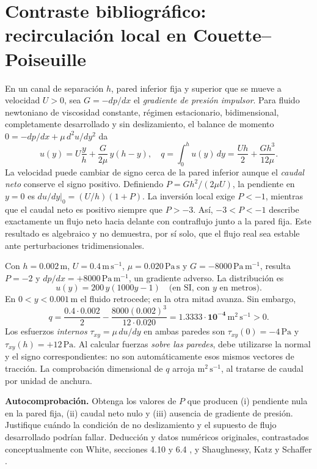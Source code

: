 
\section{Contraste bibliográfico: recirculación local en Couette--Poiseuille}
\label{sec:ref26-couette}

En un canal de separación \(h\), pared inferior fija y superior que se mueve a velocidad \(U>0\), sea \(G=-dp/dx\) el \emph{gradiente de presión impulsor}. Para fluido newtoniano de viscosidad constante, régimen estacionario, bidimensional, completamente desarrollado y sin deslizamiento, el balance de momento \(0=-dp/dx+\mu\,d^2u/dy^2\) da
\begin{equation}
u(y)=U\frac yh+\frac{G}{2\mu}\,y(h-y),\quad
q=\int_0^h u(y)\,dy=\frac{Uh}{2}+\frac{Gh^3}{12\mu}.
\label{eq:ref26-couette-q}
\end{equation}
La velocidad puede cambiar de signo cerca de la pared inferior aunque el \emph{caudal neto} conserve el signo positivo. Definiendo \(P=Gh^2/(2\mu U)\), la pendiente en \(y=0\) es \(du/dy|_0=(U/h)(1+P)\). La inversión local exige \(P<-1\), mientras que el caudal neto es positivo siempre que \(P>-3\). Así, \(-3<P<-1\) describe exactamente un flujo neto hacia delante con contraflujo junto a la pared fija. Este resultado es algebraico y no demuestra, por sí solo, que el flujo real sea estable ante perturbaciones tridimensionales.

\begin{tcolorbox}[title={Ejemplo guiado original: caudal y esfuerzos}, studiumdef, breakable]
Con \(h=0.002\,\mathrm{m}\), \(U=0.4\,\mathrm{m\,s^{-1}}\), \(\mu=0.020\,\mathrm{Pa\,s}\) y \(G=-8000\,\mathrm{Pa\,m^{-1}}\), resulta \(P=-2\) y \(dp/dx=+8000\,\mathrm{Pa\,m^{-1}}\), un gradiente adverso. La distribución es
\[
 u(y)=200\,y(1000y-1)\quad\text{(en SI, con \(y\) en metros)}.
\]
En \(0<y<0.001\,\mathrm{m}\) el fluido retrocede; en la otra mitad avanza. Sin embargo,
\[
 q=\frac{0.4\cdot0.002}{2}
    -\frac{8000(0.002)^3}{12\cdot0.020}
   =\mathbf{1.3333\cdot10^{-4}\,\mathrm{m^2\,s^{-1}}}>0.
\]
Los esfuerzos \emph{internos} \(\tau_{xy}=\mu\,du/dy\) en ambas paredes son \(\tau_{xy}(0)=-4\,\mathrm{Pa}\) y \(\tau_{xy}(h)=+12\,\mathrm{Pa}\). Al calcular fuerzas \emph{sobre las paredes}, debe utilizarse la normal y el signo correspondientes: no son automáticamente esos mismos vectores de tracción. La comprobación dimensional de \(q\) arroja \(\mathrm{m^2\,s^{-1}}\), al tratarse de caudal por unidad de anchura.
\end{tcolorbox}

\textbf{Autocomprobación.} Obtenga los valores de \(P\) que producen (i) pendiente nula en la pared fija, (ii) caudal neto nulo y (iii) ausencia de gradiente de presión. Justifique cuándo la condición de no deslizamiento y el supuesto de flujo desarrollado podrían fallar. Deducción y datos numéricos originales, contrastados conceptualmente con White, secciones 4.10 y 6.4 \cite{ref26-white}, y Shaughnessy, Katz y Schaffer \cite{ref26-shaughnessy}.
